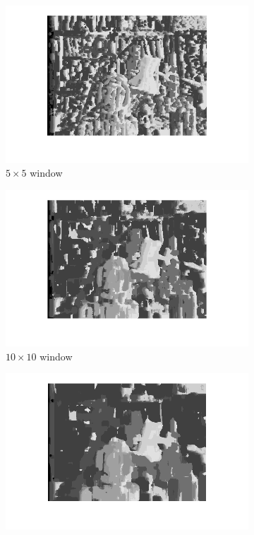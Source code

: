 \documentclass{article}
\begin{document}
\begin{figure}[ht!]
 \begin{subfigure}{.3\textwidth}
  \centering
  \includegraphics[width=\linewidth]{ex3/a5_5.png}
  \caption{$5\times5$ window}
  \label{fig_a1g}
 \end{subfigure}
 \begin{subfigure}{.3\textwidth}
  \centering
  \includegraphics[width=\linewidth]{ex3/a10_10.png}
  \caption{$10\times10$ window}
  \label{fig_a2g}
 \end{subfigure}
 \begin{subfigure}{.3\textwidth}
  \centering
  \includegraphics[width=1\linewidth]{ex3/a15_15.png}

\end{subfigure}
\end{figure}
\end{document}
